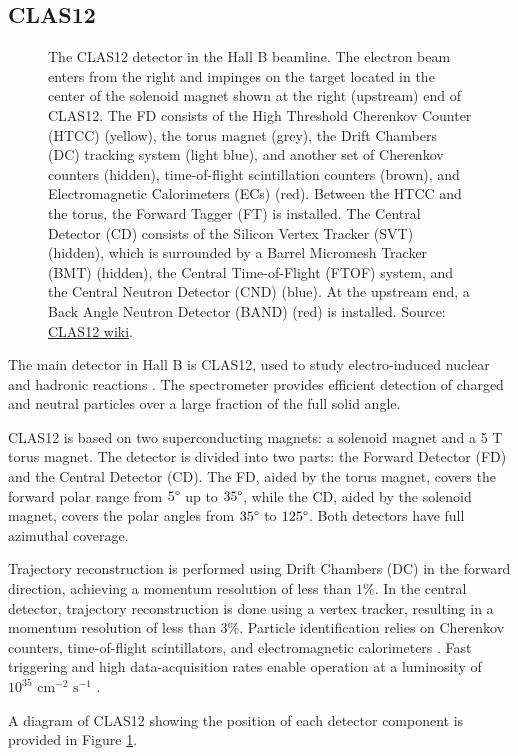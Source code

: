 \subsection{CLAS12}
\label{11.200::clas12}
    \begin{figure}[b!]
        \centering{}
        \caption[CLAS12.]{The CLAS12 detector in the Hall B beamline.
        The electron beam enters from the right and impinges on the target located in the center of the solenoid magnet shown at the right (upstream) end of CLAS12.
        The FD consists of the High Threshold Cherenkov Counter (HTCC) (yellow), the torus magnet (grey), the Drift Chambers (DC) tracking system (light blue), and another set of Cherenkov counters (hidden), time-of-flight scintillation counters (brown), and Electromagnetic Calorimeters (ECs) (red).
        Between the HTCC and the torus, the Forward Tagger (FT) is installed.
        The Central Detector (CD) consists of the Silicon Vertex Tracker (SVT) (hidden), which is surrounded by a Barrel Micromesh Tracker (BMT) (hidden), the Central Time-of-Flight (FTOF) system, and the Central Neutron Detector (CND) (blue).
        At the upstream end, a Back Angle Neutron Detector (BAND) (red) is installed.
        Source: \href{https://jlab.org/physics/hall-b/clas12}{CLAS12 wiki}.}
        \label{fig::11.200::clas12_diagram}
    \end{figure}

    The main detector in Hall B is CLAS12, used to study electro-induced nuclear and hadronic reactions \cite{burkert2020}.
    The spectrometer provides efficient detection of charged and neutral particles over a large fraction of the full solid angle.

    CLAS12 is based on two superconducting magnets: a solenoid magnet and a 5 T torus magnet.
    The detector is divided into two parts: the Forward Detector (FD) and the Central Detector (CD).
    The FD, aided by the torus magnet, covers the forward polar range from $5\degree$ up to $35\degree$, while the CD, aided by the solenoid magnet, covers the polar angles from $35\degree$ to $125\degree$.
    Both detectors have full azimuthal coverage.

    Trajectory reconstruction is performed using Drift Chambers (DC) in the forward direction, achieving a momentum resolution of less than $1\%$.
    In the central detector, trajectory reconstruction is done using a vertex tracker, resulting in a momentum resolution of less than $3\%$.
    Particle identification relies on Cherenkov counters, time-of-flight scintillators, and electromagnetic calorimeters \cite{burkert2020}.
    Fast triggering and high data-acquisition rates enable operation at a luminosity of $10^{35} \text{ cm}^{-2}\text{ s}^{-1}$ \cite{burkert2020}.

    A diagram of CLAS12 showing the position of each detector component is provided in Figure \ref{fig::11.200::clas12_diagram}.

    
    
    
